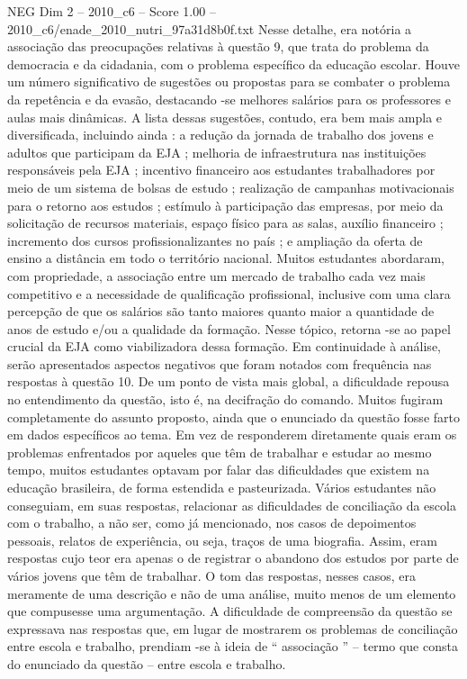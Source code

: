 \begin{textsample}{NEG Dim 2 – 2010\_c6 – Score 1.00 – 2010\_c6/enade\_2010\_nutri\_97a31d8b0f.txt}
Nesse detalhe, era notória a associação das preocupações relativas à questão 9, que trata do problema da democracia e da cidadania, com o problema específico da educação escolar.
Houve um número significativo de sugestões ou propostas para se combater o problema da repetência e da evasão, destacando -se melhores salários para os professores e aulas mais dinâmicas.
A lista dessas sugestões, contudo, era bem mais ampla e diversificada, incluindo ainda : a redução da jornada de trabalho dos jovens e adultos que participam da EJA ; melhoria de infraestrutura nas instituições responsáveis pela EJA ; incentivo financeiro aos estudantes trabalhadores por meio de um sistema de bolsas de estudo ; realização de campanhas motivacionais para o retorno aos estudos ; estímulo à participação das empresas, por meio da solicitação de recursos materiais, espaço físico para as salas, auxílio financeiro ; incremento dos cursos profissionalizantes no país ; e ampliação da oferta de ensino a distância em todo o território nacional.
Muitos estudantes abordaram, com propriedade, a associação entre um mercado de trabalho cada vez mais competitivo e a necessidade de qualificação profissional, inclusive com uma clara percepção de que os salários são tanto maiores quanto maior a quantidade de anos de estudo e/ou a qualidade da formação.
Nesse tópico, retorna -se ao papel crucial da EJA como viabilizadora dessa formação.
Em continuidade à análise, serão apresentados aspectos negativos que foram notados com frequência nas respostas à questão 10.
De um ponto de vista mais global, a dificuldade repousa no entendimento da questão, isto é, na decifração do comando.
Muitos fugiram completamente do assunto proposto, ainda que o enunciado da questão fosse farto em dados específicos ao tema.
Em vez de responderem diretamente quais eram os problemas enfrentados por aqueles que têm de trabalhar e estudar ao mesmo tempo, muitos estudantes optavam por falar das dificuldades que existem na educação brasileira, de forma estendida e pasteurizada.
Vários estudantes não conseguiam, em suas respostas, relacionar as dificuldades de conciliação da escola com o trabalho, a não ser, como já mencionado, nos casos de depoimentos pessoais, relatos de experiência, ou seja, traços de uma biografia.
Assim, eram respostas cujo teor era apenas o de registrar o abandono dos estudos por parte de vários jovens que têm de trabalhar.
O tom das respostas, nesses casos, era meramente de uma descrição e não de uma análise, muito menos de um elemento que compusesse uma argumentação.
A dificuldade de compreensão da questão se expressava nas respostas que, em lugar de mostrarem os problemas de conciliação entre escola e trabalho, prendiam -se à ideia de “ associação ” – termo que consta do enunciado da questão – entre escola e trabalho.

\end{textsample}
